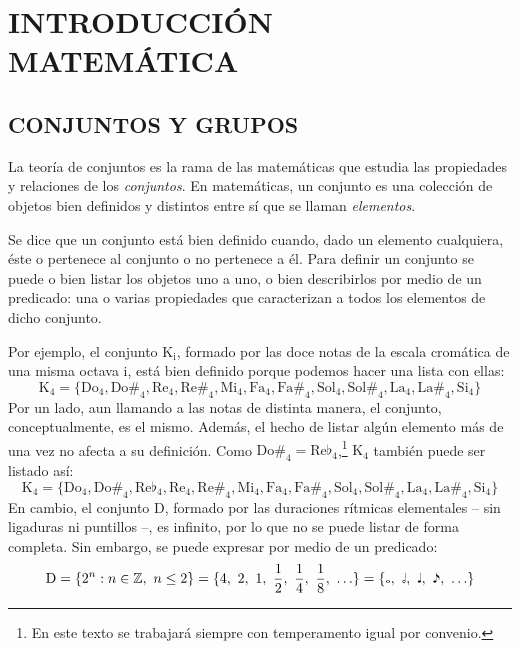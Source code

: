 \chapter{INTRODUCCIÓN MATEMÁTICA}
	\section{CONJUNTOS Y GRUPOS}
		La teoría de conjuntos es la rama de las matemáticas que estudia las propiedades y relaciones de los \emph{conjuntos}. En matemáticas, un conjunto es una colección de objetos bien definidos y distintos entre sí que se llaman \emph{elementos}.
	
		Se dice que un conjunto está bien definido cuando, dado un elemento cualquiera, éste o pertenece al conjunto o no pertenece a él. Para definir un conjunto se puede o bien listar los objetos uno a uno, o bien describirlos por medio de un predicado: una o varias propiedades que caracterizan a todos los elementos de dicho conjunto.

		Por ejemplo, el conjunto K$_\text{i}$, formado por las doce notas de la escala cromática de una misma octava i, está bien definido porque podemos hacer una lista con ellas:	
		$$\text{K}_\text{4} = \{\text{Do}_\text{4}, \text{Do\#}_\text{4}, \text{Re}_\text{4}, \text{Re\#}_\text{4}, \text{Mi}_\text{4}, \text{Fa}_\text{4}, \text{Fa\#}_\text{4}, \text{Sol}_\text{4}, \text{Sol\#}_\text{4}, \text{La}_\text{4}, \text{La\#}_\text{4}, \text{Si}_\text{4}\}$$
		Por un lado, aun llamando a las notas de distinta manera, el conjunto, conceptualmente, es el mismo. Además, el hecho de listar algún elemento más de una vez no afecta a su definición. Como $\text{Do\#}_\text{4} = \text{Re}\flat_\text{4}$,\footnote{En este texto se trabajará siempre con temperamento igual por convenio.}  $\text{K}_\text{4}$ también puede ser listado así:$$\text{K}_\text{4} = \{\text{Do}_\text{4}, \text{Do\#}_\text{4}, \text{Re}\flat_\text{4}, \text{Re}_\text{4}, \text{Re\#}_\text{4}, \text{Mi}_\text{4}, \text{Fa}_\text{4}, \text{Fa\#}_\text{4}, \text{Sol}_\text{4}, \text{Sol\#}_\text{4}, \text{La}_\text{4}, \text{La\#}_\text{4}, \text{Si}_\text{4}\}$$
		En cambio, el conjunto D, formado por las duraciones rítmicas elementales -- sin ligaduras ni puntillos --, es infinito, por lo que no se puede listar de forma completa. Sin embargo, se puede expresar por medio de un predicado:
		$$\text{D} =\{2^n:n\in\mathbb{Z},\ n\le 2\} = \{4,\ 2,\ 1,\ \frac{1}{2},\ \frac{1}{4},\ \frac{1}{8},\ \ldots\} = \{\fullnote,\ \halfnote,\ \quarternote,\ \eighthnote,\ \ldots\}$$
	
